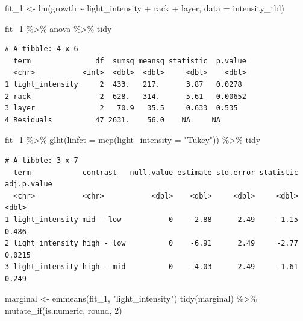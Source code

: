 \documentclass[
  letterpaper,
  DIV=11,
  oneside]{scrreport}
\newenvironment{Shaded}{\begin{snugshade}}{\end{snugshade}}
\newcommand{\AttributeTok}[1]{\textcolor[rgb]{0.40,0.45,0.13}{#1}}
\newcommand{\DecValTok}[1]{\textcolor[rgb]{0.68,0.00,0.00}{#1}}
\newcommand{\FunctionTok}[1]{\textcolor[rgb]{0.28,0.35,0.67}{#1}}
\newcommand{\NormalTok}[1]{\textcolor[rgb]{0.00,0.23,0.31}{#1}}
\newcommand{\OtherTok}[1]{\textcolor[rgb]{0.00,0.23,0.31}{#1}}
\newcommand{\SpecialCharTok}[1]{\textcolor[rgb]{0.37,0.37,0.37}{#1}}
\newcommand{\StringTok}[1]{\textcolor[rgb]{0.13,0.47,0.30}{#1}}
\begin{document}
\begin{Shaded}
\begin{Highlighting}[]
\NormalTok{fit\_1 }\OtherTok{\textless{}{-}} \FunctionTok{lm}\NormalTok{(growth }\SpecialCharTok{\textasciitilde{}}\NormalTok{ light\_intensity }\SpecialCharTok{+}\NormalTok{ rack }\SpecialCharTok{+}\NormalTok{ layer, }\AttributeTok{data =}\NormalTok{ intensity\_tbl)}

\NormalTok{fit\_1 }\SpecialCharTok{\%\textgreater{}\%}\NormalTok{ anova }\SpecialCharTok{\%\textgreater{}\%}\NormalTok{ tidy}
\end{Highlighting}
\end{Shaded}

\begin{verbatim}
# A tibble: 4 x 6
  term               df  sumsq meansq statistic  p.value
  <chr>           <int>  <dbl>  <dbl>     <dbl>    <dbl>
1 light_intensity     2  433.   217.      3.87   0.0278 
2 rack                2  628.   314.      5.61   0.00652
3 layer               2   70.9   35.5     0.633  0.535  
4 Residuals          47 2631.    56.0    NA     NA      
\end{verbatim}

\begin{Shaded}
\begin{Highlighting}[]
\NormalTok{fit\_1 }\SpecialCharTok{\%\textgreater{}\%} \FunctionTok{glht}\NormalTok{(}\AttributeTok{linfct =} \FunctionTok{mcp}\NormalTok{(}\AttributeTok{light\_intensity =} \StringTok{"Tukey"}\NormalTok{)) }\SpecialCharTok{\%\textgreater{}\%}\NormalTok{ tidy}
\end{Highlighting}
\end{Shaded}

\begin{verbatim}
# A tibble: 3 x 7
  term            contrast   null.value estimate std.error statistic adj.p.value
  <chr>           <chr>           <dbl>    <dbl>     <dbl>     <dbl>       <dbl>
1 light_intensity mid - low           0    -2.88      2.49     -1.15      0.486 
2 light_intensity high - low          0    -6.91      2.49     -2.77      0.0215
3 light_intensity high - mid          0    -4.03      2.49     -1.61      0.249 
\end{verbatim}

\begin{Shaded}
\begin{Highlighting}[]
\NormalTok{marginal }\OtherTok{\textless{}{-}} \FunctionTok{emmeans}\NormalTok{(fit\_1, }\StringTok{"light\_intensity"}\NormalTok{)}
\FunctionTok{tidy}\NormalTok{(marginal) }\SpecialCharTok{\%\textgreater{}\%} 
  \FunctionTok{mutate\_if}\NormalTok{(is.numeric, round, }\DecValTok{2}\NormalTok{)}
\end{Highlighting}
\end{Shaded}
\end{document}
